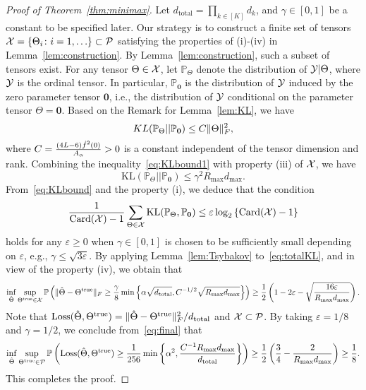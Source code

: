 \documentclass[11pt]{article}
\theoremstyle{plain}
\theoremstyle{definition}
\begin{document}
\begin{proof}[Proof of Theorem~\ref{thm:minimax}]

Let $d_{\text{total}}=\prod_{k\in[K]}d_k$, and $\gamma\in[0,1]$ be a constant to be specified later.  Our strategy is to construct a finite set of tensors $\mathcal{X}=\{\Theta_i\colon i=1,\ldots \}\subset \mathcal{P}$ satisfying the properties of (i)-(iv) in Lemma~\ref{lem:construction}. By Lemma~\ref{lem:construction}, such a subset of tensors exist. For any tensor  $\Theta\in\mathcal{X}$, let $\mathbb{P}_{\Theta}$ denote the distribution of $\mathcal{Y}|\Theta$, where $\mathcal{Y}$ is the ordinal tensor. In particular, $\mathbb{P}_{\mathbf{0}}$ is the distribution of $\mathcal{Y}$ induced by the zero parameter tensor $\mathbf{0}$, i.e., the distribution of $\mathcal{Y}$ conditional on the parameter tensor $\Theta=\mathbf{0}$. Based on the Remark for Lemma~\ref{lem:KL}, we have
\begin{equation}\label{eq:KLbound1}
KL(\mathbb{P}_{\Theta}|| \mathbb{P}_{\mathbf{0}})\leq C \lVert\Theta\rVert_F^2,
\end{equation}
where $C={(4L-6) \dot{f}^2(0)\over  A_\alpha}>0$ is a constant independent of the tensor dimension and rank.
Combining the inequality~\eqref{eq:KLbound1} with property (iii) of $\mathcal{X}$, we have
\begin{equation}\label{eq:KLbound}
\text{KL}(\mathbb{P}_{\Theta}||\mathbb{P}_{\mathbf{0}})\leq \gamma^2 R_{\max} d_{\max}.
\end{equation}
From~\eqref{eq:KLbound} and the property (i), we deduce that the condition
\begin{equation}\label{eq:totalKL}
{1\over \text{Card}(\mathcal{X})-1}\sum_{\Theta \in\mathcal{X}}\text{KL}(\mathbb{P}_{\Theta}, \mathbb{P}_{\mathbf{0}})\leq \varepsilon \log_2\left\{\text{Card}(\mathcal{X})-1 \right\}
\end{equation}
holds for any $ \varepsilon \geq 0$ when $\gamma\in[0,1]$ is chosen to be sufficiently small depending on $\varepsilon$, e.g., $\gamma \leq \sqrt{3\varepsilon}$. By applying Lemma~\ref{lem:Tsybakov} to~\eqref{eq:totalKL}, and in view of the property (iv), we obtain that
\begin{equation}\label{eq:final}
\inf_{\hat \Theta}\sup_{\Theta^{\mathrm{true}}\in \mathcal{X}}\mathbb{P}\left(\lVert\hat \Theta- \Theta^{\mathrm{true}}\rVert_F\geq  {\gamma\over 8} \min\left\{ \alpha\sqrt{d_{\text{total}}}, C^{-1/2}\sqrt{ R_{\max}d_{\max}}\right\} \right)\geq {1\over 2}\left(1-2\varepsilon-\sqrt{16 \varepsilon \over R_{\max}d_{\max}}\right).
\end{equation}
Note that $\text{Loss}(\hat \Theta, \Theta^{\mathrm{true}})=\lVert\hat \Theta- \Theta^{\mathrm{true}}\rVert_F^2/d_{\text{total}}$ and $\mathcal{X}\subset \mathcal{P}$. By taking $\varepsilon=1/8$ and $\gamma=1/2$, we conclude from~\eqref{eq:final} that
\begin{equation}\label{eq:prob}
\inf_{\hat \Theta}\sup_{\Theta^{\mathrm{true}}\in \mathcal{P}}\mathbb{P}\left(\text{Loss}(\hat \Theta, \Theta^{\mathrm{true}})\geq {1 \over 256}\min\left \{ \alpha^2,  {C^{-1}R_{\max}d_{\max}\over d_{\text{total}}}\right \}\right)\geq {1\over 2}\left({3\over 4}- {2\over R_{\max}d_{\max}} \right)\geq {1\over 8}.
\end{equation}
This completes the proof.
\end{proof}
\end{document}
